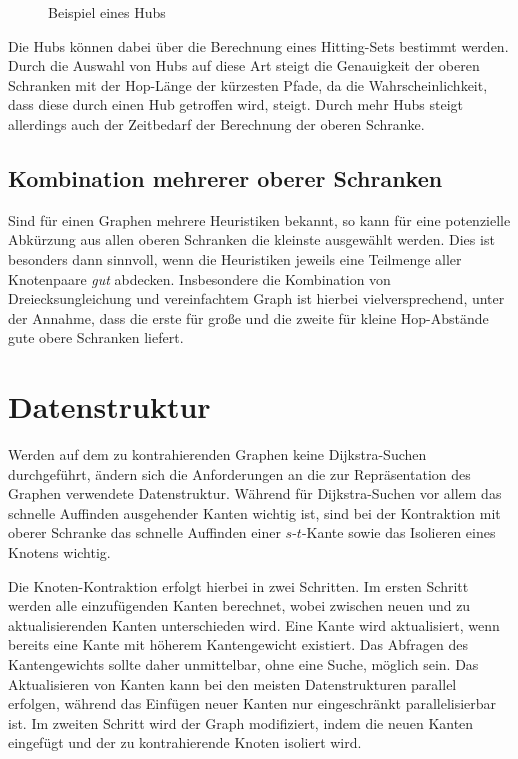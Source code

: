 \begin{figure}[h!]
    \centering

    \caption{Beispiel eines Hubs}
\end{figure}

Die Hubs können dabei über die Berechnung eines Hitting-Sets bestimmt werden.
Durch die Auswahl von Hubs auf diese Art steigt die Genauigkeit der oberen Schranken mit der Hop-Länge der kürzesten Pfade, da die Wahrscheinlichkeit, dass diese durch einen Hub getroffen wird, steigt.
Durch mehr Hubs steigt allerdings auch der Zeitbedarf der Berechnung der oberen Schranke.

\subsection{Kombination mehrerer oberer Schranken}
Sind für einen Graphen mehrere Heuristiken bekannt, so kann für eine potenzielle Abkürzung aus allen oberen Schranken die kleinste ausgewählt werden.
Dies ist besonders dann sinnvoll, wenn die Heuristiken jeweils eine Teilmenge aller Knotenpaare \emph{gut} abdecken.
Insbesondere die Kombination von Dreiecksungleichung und vereinfachtem Graph ist hierbei vielversprechend, unter der Annahme, dass die erste für große und die zweite für kleine Hop-Abstände gute obere Schranken liefert.

\section{Datenstruktur}

Werden auf dem zu kontrahierenden Graphen keine Dijkstra-Suchen durchgeführt, ändern sich die Anforderungen an die zur Repräsentation des Graphen verwendete Datenstruktur.
Während für Dijkstra-Suchen vor allem das schnelle Auffinden ausgehender Kanten wichtig ist, sind bei der Kontraktion mit oberer Schranke das schnelle Auffinden einer $s$-$t$-Kante sowie das Isolieren eines Knotens wichtig.

Die Knoten-Kontraktion erfolgt hierbei in zwei Schritten.
Im ersten Schritt werden alle einzufügenden Kanten berechnet, wobei zwischen neuen und zu aktualisierenden Kanten unterschieden wird.
Eine Kante wird aktualisiert, wenn bereits eine Kante mit höherem Kantengewicht existiert.
Das Abfragen des Kantengewichts sollte daher unmittelbar, ohne eine Suche, möglich sein.
Das Aktualisieren von Kanten kann bei den meisten Datenstrukturen parallel erfolgen, während das Einfügen neuer Kanten nur eingeschränkt parallelisierbar ist.
Im zweiten Schritt wird der Graph modifiziert, indem die neuen Kanten eingefügt und der zu kontrahierende Knoten isoliert wird.

